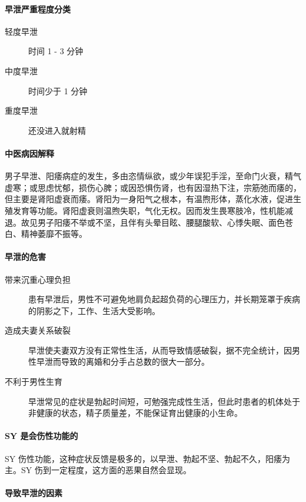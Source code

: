 \documentclass[fontset=founder]{ctexart}
\begin{document}
\paragraph{早泄严重程度分类}

\begin{description}
    \item[轻度早泄] 时间 1 - 3 分钟
    \item[中度早泄] 时间少于 1 分钟
    \item[重度早泄] 还没进入就射精
\end{description}

\paragraph{中医病因解释}

男子早泄、阳痿病症的发生，多由恣情纵欲，或少年误犯手淫，至命门火衰，精气虚寒；或思虑忧郁，损伤心脾；或因恐惧伤肾，也有因湿热下注，宗筋弛而痿的，但主要是肾阳虚衰而痿。肾阳为一身阳气之根本，有温煦形体，蒸化水液，促进生殖发育等功能。肾阳虚衰则温煦失职，气化无权。因而发生畏寒肢冷，性机能减退。故见男子阳痿不举或不坚，且伴有头晕目眩、腰腿酸软、心悸失眠、面色苍白、精神萎靡不振等。

\paragraph{早泄的危害}

\begin{description}
    \item[带来沉重心理负担] 患有早泄后，男性不可避免地肩负起超负荷的心理压力，并长期笼罩于疾病的阴影之下，工作、生活大受影响。
    \item[造成夫妻关系破裂] 早泄使夫妻双方没有正常性生活，从而导致情感破裂，据不完全统计，因男性早泄而导致的离婚和分手占总数的很大一部分。
    \item[不利于男性生育] 早泄常见的症状是勃起时间短，可勉强完成性生活，但此时患者的机体处于非健康的状态，精子质量差，不能保证育出健康的小生命。
\end{description}

\paragraph{SY 是会伤性功能的}

SY 伤性功能，这种症状反馈是极多的，以早泄、勃起不坚、勃起不久，阳痿为主。SY 伤到一定程度，这方面的恶果自然会显现。

\paragraph{导致早泄的因素}
\end{document}

